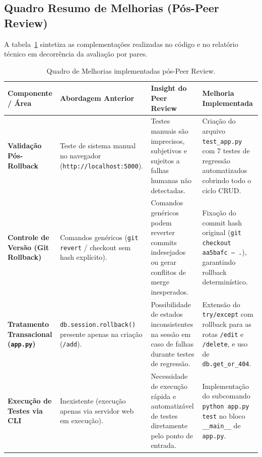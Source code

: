 \documentclass[12pt,a4paper]{article}
\begin{document}
\subsection{Quadro Resumo de Melhorias (Pós-Peer Review)}

A tabela~\ref{tab:quadro-melhorias} sintetiza as complementações realizadas no código
e no relatório técnico em decorrência da avaliação por pares.

\begin{table}[h!]
  \centering
  \caption{Quadro de Melhorias implementadas pós-Peer Review.}
  \vspace{0.4em}
  \label{tab:quadro-melhorias}
  \small
  \begin{tabular}{p{3.0cm}p{3.2cm}p{3.8cm}p{4.2cm}}
    \toprule
    \textbf{Componente / Área} & \textbf{Abordagem Anterior} & \textbf{Insight do Peer Review} & \textbf{Melhoria Implementada} \\
    \midrule
    \textbf{Validação Pós-Rollback} &
    Teste de sistema manual no navegador (\texttt{http://localhost:5000}). &
    Testes manuais são imprecisos, subjetivos e sujeitos a falhas humanas não detectadas. &
    Criação do arquivo \texttt{test\_app.py} com 7 testes de regressão automatizados cobrindo todo o ciclo CRUD. \\
    \addlinespace
    \textbf{Controle de Versão (Git Rollback)} &
    Comandos genéricos (\texttt{git revert} / checkout sem hash explícito). &
    Comandos genéricos podem reverter commits indesejados ou gerar conflitos de merge inesperados. &
    Fixação do commit hash original (\texttt{git checkout aa5bafc -- .}), garantindo rollback determinístico. \\
    \addlinespace
    \textbf{Tratamento Transacional (\texttt{app.py})} &
    \texttt{db.session.rollback()} presente apenas na criação (\texttt{/add}). &
    Possibilidade de estados inconsistentes na sessão em caso de falhas durante testes de regressão. &
    Extensão do \texttt{try/except} com rollback para as rotas \texttt{/edit} e \texttt{/delete}, e uso de \texttt{db.get\_or\_404}. \\
    \addlinespace
    \textbf{Execução de Testes via CLI} &
    Inexistente (execução apenas via servidor web em execução). &
    Necessidade de execução rápida e automatizável de testes diretamente pelo ponto de entrada. &
    Implementação do subcomando \texttt{python app.py test} no bloco \texttt{\_\_main\_\_} de \texttt{app.py}. \\
    \bottomrule
  \end{tabular}
\end{table}
\end{document}
